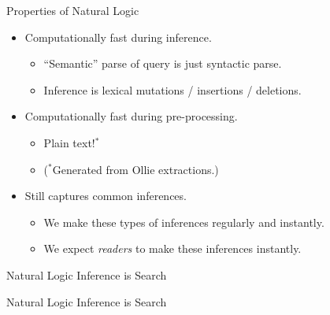\documentclass[hyperref]{beamer}
\begin{document}




\begin{frame}{Properties of Natural Logic}
\begin{itemize}
  \item[\green{\checkmark}] Computationally fast during inference.
  \begin{itemize}
    \item ``Semantic'' parse of query is just syntactic parse.
    \item Inference is lexical mutations / insertions / deletions.
  \end{itemize}
  \vspace{0.5cm}
  \pause

  \item[\green{\checkmark}] Computationally fast during pre-processing.
  \begin{itemize}
    \item Plain text!$^*$
    \pause
    \item[] ($^*$Generated from Ollie extractions.)
  \end{itemize}
  \vspace{0.5cm}
  \pause

  \item[\green{\checkmark}] Still captures common inferences.
  \begin{itemize}
    \item We make these types of inferences regularly and instantly.
    \pause
    \item We expect \textit{readers} to make these inferences instantly.
  \end{itemize}
\end{itemize}
\end{frame}


\begin{frame}{Natural Logic Inference is Search}
   \teaserInference
\end{frame}
\begin{frame}[noframenumbering]{Natural Logic Inference is Search}
  \teaserFullDerivation
\end{frame}
\end{document}
